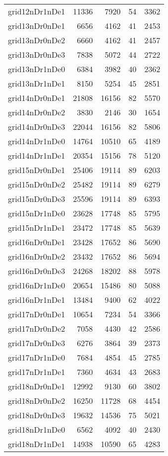 \begin{tabular}{lrrrr}
grid12nDr1nDe1 & 11336 & 7920 & 54 & 3362 \\
grid13nDr0nDe1 & 6656 & 4162 & 41 & 2453 \\
grid13nDr0nDe2 & 6660 & 4162 & 41 & 2457 \\
grid13nDr0nDe3 & 7838 & 5072 & 44 & 2722 \\
grid13nDr1nDe0 & 6384 & 3982 & 40 & 2362 \\
grid13nDr1nDe1 & 8150 & 5254 & 45 & 2851 \\
grid14nDr0nDe1 & 21808 & 16156 & 82 & 5570 \\
grid14nDr0nDe2 & 3830 & 2146 & 30 & 1654 \\
grid14nDr0nDe3 & 22044 & 16156 & 82 & 5806 \\
grid14nDr1nDe0 & 14764 & 10510 & 65 & 4189 \\
grid14nDr1nDe1 & 20354 & 15156 & 78 & 5120 \\
grid15nDr0nDe1 & 25406 & 19114 & 89 & 6203 \\
grid15nDr0nDe2 & 25482 & 19114 & 89 & 6279 \\
grid15nDr0nDe3 & 25596 & 19114 & 89 & 6393 \\
grid15nDr1nDe0 & 23628 & 17748 & 85 & 5795 \\
grid15nDr1nDe1 & 23472 & 17748 & 85 & 5639 \\
grid16nDr0nDe1 & 23428 & 17652 & 86 & 5690 \\
grid16nDr0nDe2 & 23432 & 17652 & 86 & 5694 \\
grid16nDr0nDe3 & 24268 & 18202 & 88 & 5978 \\
grid16nDr1nDe0 & 20654 & 15486 & 80 & 5088 \\
grid16nDr1nDe1 & 13484 & 9400 & 62 & 4022 \\
grid17nDr0nDe1 & 10654 & 7234 & 54 & 3366 \\
grid17nDr0nDe2 & 7058 & 4430 & 42 & 2586 \\
grid17nDr0nDe3 & 6276 & 3864 & 39 & 2373 \\
grid17nDr1nDe0 & 7684 & 4854 & 45 & 2785 \\
grid17nDr1nDe1 & 7360 & 4634 & 43 & 2683 \\
grid18nDr0nDe1 & 12992 & 9130 & 60 & 3802 \\
grid18nDr0nDe2 & 16250 & 11728 & 68 & 4454 \\
grid18nDr0nDe3 & 19632 & 14536 & 75 & 5021 \\
grid18nDr1nDe0 & 6562 & 4092 & 40 & 2430 \\
grid18nDr1nDe1 & 14938 & 10590 & 65 & 4283 \\

\end{tabular}

